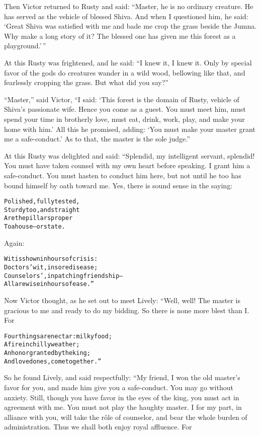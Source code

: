 \documentclass{article}
\renewenvironment{verbatim}{\begin{alltt}\normalfont\begin{centering}}{\end{centering}\end{alltt}}
\begin{document}
Then Victor returned to Rusty and said:
``Master, he is no ordinary creature. He has served as the vehicle of blessed Shiva. And when I questioned him, he said: `Great Shiva was satisfied with me and bade me crop the grass beside the Jumna. Why make a long story of it? The blessed one has given me this forest as a playground.'\,''

At this Rusty was frightened, and he said:
``I knew it, I knew it. Only by special favor of the gods do creatures wander in a wild wood, bellowing like that, and fearlessly cropping the grass. But what did you say?''

``Master,'' said Victor,
``I said: `This forest is the domain of Rusty, vehicle of Shiva's passionate wife. Hence you come as a guest. You must meet him, must spend your time in brotherly love, must eat, drink, work, play, and make your home with him.' All this he promised, adding: `You must make your master grant me a safe-conduct.' As to that, the master is the sole judge.''

At this Rusty was delighted and said: “Splendid, my intelligent
servant, splendid! You must have taken counsel with my own heart
before speaking. I grant him a safe-conduct. You must hasten to
conduct him here, but not until he too has bound himself by oath
toward me. Yes, there is sound sense in the saying:

\begin{verbatim}
Polished, fully tested,
    Sturdy too, and straight
Are the pillars proper
    To a house--or state.
\end{verbatim}
Again:

\begin{verbatim}
Wit is shown in hours of crisis:
    Doctors' wit, in sore disease;
Counselors', in patching friendship--
    All are wise in hours of ease.”
\end{verbatim}
Now Victor thought, as he set out to meet Lively: “Well, well! The
master is gracious to me and ready to do my bidding. So there is
none more blest than I. For

\begin{verbatim}
Four things are nectar: milky food;
    A fire in chilly weather;
An honor granted by the king;
    And loved ones, come together.”
\end{verbatim}
So he found Lively, and said respectfully: “My friend, I won the
old master's favor for you, and made him give you a safe-conduct.
You may go without anxiety. Still, though you have favor in the
eyes of the king, you must act in agreement with me. You must not
play the haughty master. I for my part, in alliance with you, will
take the rôle of counselor, and bear the whole burden of
administration. Thus we shall both enjoy royal affluence. For
\end{document}
